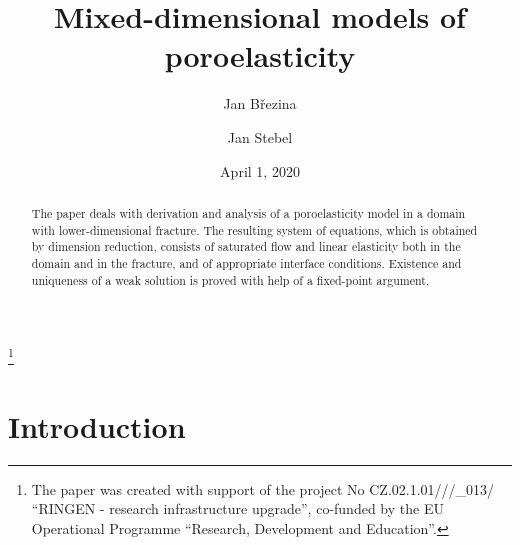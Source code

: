 \documentclass[a4paper]{m2an}
\numberwithin{equation}{section}
\begin{document}
\title{Mixed-dimensional models of poroelasticity}\thanks{The paper was created with support of the project No CZ.02.1.01///\_013/ ``RINGEN - research infrastructure upgrade'', co-funded by the EU Operational Programme ``Research, Development and Education''.}

\author{Jan B\v rezina}
\address{Institute of New Technologies and Applied Informatics,
Faculty of Mechatronics, Informatics and Interdisciplinary Studies,
Technical University of Liberec, Studentská 1402/2, 461 17 Liberec, Czech Republic;
}
\author{Jan Stebel}

\date{April 1, 2020}

\begin{abstract}
The paper deals with derivation and analysis of a poroelasticity model in a domain with lower-dimensional fracture.
The resulting system of equations, which is obtained by dimension reduction, consists of saturated flow and linear elasticity both in the domain and in the fracture, and of appropriate interface conditions.
Existence and uniqueness of a weak solution is proved with help of a fixed-point argument.
\end{abstract}





\maketitle



\section{Introduction}
\end{document}
